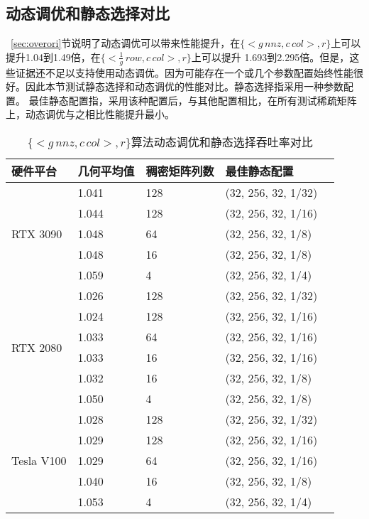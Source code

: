 \subsection{动态调优和静态选择对比}\label{sec:dystd}
~\ref{sec:overori}节说明了动态调优可以带来性能提升，在$\{<g\,nnz , c\,col>,r\}$上可以提升1.04到1.49倍，在$\{<\frac{1}{g}\,row , c\,col>,r\}$上可以提升
1.693到2.295倍。但是，这些证据还不足以支持使用动态调优。因为可能存在一个或几个参数配置始终性能很好。因此本节测试静态选择和动态调优的性能对比。静态选择指采用一种参数配置。
最佳静态配置指，采用该种配置后，与其他配置相比，在所有测试稀疏矩阵上，动态调优与之相比性能提升最小。
\begin{table}
  \centering
  \caption{$\{<g\,nnz , c\,col>,r\}$算法动态调优和静态选择吞吐率对比}
  \begin{tabular}{lllll}
  \toprule
  硬件平台 & 几何平均值  & 稠密矩阵列数 & 最佳静态配置 \\
  \midrule
  \multirow{5}{*}{RTX 3090}& 1.041  & 128 & (32, 256, 32, 1/32)\\
                          & 1.044   & 128 & (32, 256, 32, 1/16)\\
                          & 1.048   & 64 & (32, 256, 32, 1/8)\\
                          & 1.048   & 16 & (32, 256, 32, 1/8)\\
                          & 1.059   & 4 & (32, 256, 32, 1/4)\\
  \hline
  \multirow{6}{*}{RTX 2080}& 1.026  & 128 & (32, 256, 32, 1/32)\\
                          & 1.024   & 128 & (32, 256, 32, 1/16)\\
                          & 1.033   & 64 & (32, 256, 32, 1/16)\\
                          & 1.033   & 16 & (32, 256, 32, 1/16)\\
                          & 1.032   & 16& (32, 256, 32, 1/8)\\
                          & 1.050   & 4 & (32, 256, 32, 1/8)\\
  \hline
  \multirow{5}{*}{Tesla V100}& 1.028  & 128 & (32, 256, 32, 1/32)\\
                          & 1.029   & 128 & (32, 256, 32, 1/16)\\
                          & 1.029   & 64 & (32, 256, 32, 1/16)\\
                          & 1.040   & 16 & (32, 256, 32, 1/8)\\
                          & 1.053   & 4 & (32, 256, 32, 1/4)\\
  \bottomrule
  \end{tabular}
  \label{tab:over-sta-eb}
\end{table}
